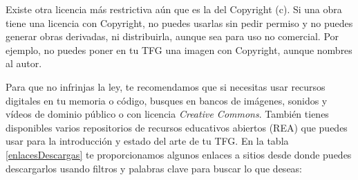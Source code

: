Existe otra licencia más restrictiva aún que es la del Copyright (c). Si una obra tiene una licencia con Copyright, no puedes usarlas sin pedir permiso y no puedes generar obras derivadas, ni distribuirla, aunque sea para uso no comercial. Por ejemplo, no puedes poner en tu TFG una imagen con Copyright, aunque nombres al autor. 

Para que no infrinjas la ley, te recomendamos que si necesitas usar recursos digitales en tu memoria o código, busques en bancos de imágenes, sonidos y vídeos de dominio público o con licencia \textit{Creative Commons}. También tienes disponibles varios repositorios de recursos educativos abiertos (REA) que puedes usar para la introducción y estado del arte de tu TFG. En la tabla \ref{enlacesDescargas} te proporcionamos algunos enlaces a sitios desde donde puedes descargarlos usando filtros y palabras clave para buscar lo que deseas:

\begin{table}[t]
\begin{center}
\caption{Sitios con recursos digitales abiertos}
\label{enlacesDescargas}
\end{center}
\end{table}


